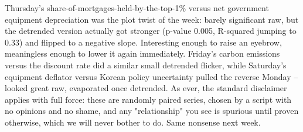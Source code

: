 Thursday's share-of-mortgages-held-by-the-top-1\% versus net government equipment depreciation was the plot twist of the week: barely significant raw, but the detrended version actually got stronger (p-value 0.005, R-squared jumping to 0.33) and flipped to a negative slope. Interesting enough to raise an eyebrow, meaningless enough to lower it again immediately. Friday's carbon emissions versus the discount rate did a similar small detrended flicker, while Saturday's equipment deflator versus Korean policy uncertainty pulled the reverse Monday -- looked great raw, evaporated once detrended. As ever, the standard disclaimer applies with full force: these are randomly paired series, chosen by a script with no opinions and no shame, and any "relationship" you see is spurious until proven otherwise, which we will never bother to do. Same nonsense next week.
